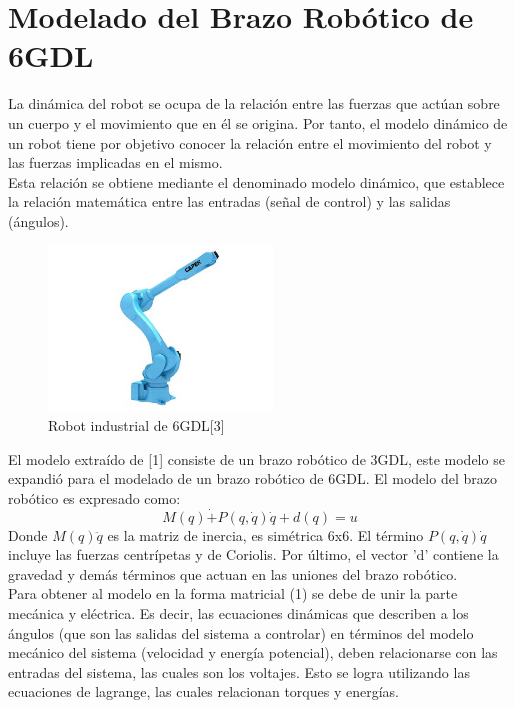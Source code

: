 \documentclass[conference]{IEEEtran}
\begin{document}
\section{Modelado del Brazo Robótico de 6GDL}
La dinámica del robot se ocupa de la relación entre las fuerzas que actúan
sobre un cuerpo y el movimiento que en él se origina. Por tanto, el modelo dinámico de un robot tiene por objetivo conocer la relación entre el movimiento del robot y las fuerzas implicadas en el mismo.\\
Esta relación se obtiene mediante el denominado modelo dinámico, que establece la relación matemática entre las entradas (señal de control) y las salidas (ángulos).


\begin{figure} [h]
\centering
\includegraphics[width=0.53\textwidth]{images/6dof_arm.jpg}
\caption{Robot industrial de 6GDL[3]}
\end{figure}

El modelo extraído de [1] consiste de un brazo robótico de 3GDL, este modelo se expandió para el modelado de un brazo robótico de 6GDL. El modelo del brazo robótico es expresado como:
\begin{equation}
M(q)\dot + P(q,\dot{q})\dot{q} + d(q) = u
\end{equation}
Donde $M(q)\ddot{q}$ es la matriz de inercia, es simétrica 6x6. El término $P(q, \dot{q})\dot{q}$ incluye las fuerzas centrípetas y de Coriolis. Por último, el vector 'd' contiene la gravedad y demás términos que actuan en las uniones del brazo robótico. \\
Para obtener al modelo en la forma matricial (1) se debe de unir la parte mecánica y eléctrica. Es decir, las ecuaciones dinámicas que describen a los ángulos (que son las salidas del sistema a controlar) en términos del modelo mecánico del sistema (velocidad y energía potencial), deben relacionarse con las entradas del sistema, las cuales son los voltajes. Esto se logra utilizando las ecuaciones de lagrange, las cuales relacionan torques y energías.
\end{document}
